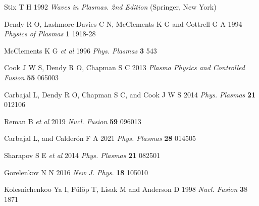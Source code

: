 \documentclass[12pt]{iopart}
\begin{document}
\begin{thebibliography}{9}
Stix T H 1992 \textit{Waves in Plasmas. 2nd Edition} (Springer, New York)

Dendy R O, Lashmore-Davies C N, McClements K G and Cottrell G A 1994 \textit{Physics of Plasmas} \textbf{1} 1918-28

McClements K G \textit{et al} 1996 \textit{Phys. Plasmas} \textbf{3} 543

Cook J W S, Dendy R O, Chapman S C 2013 \textit{Plasma Physics and Controlled Fusion} \textbf{55} 065003

Carbajal L, Dendy R O, Chapman S C, and Cook J W S 2014 \textit{Phys. Plasmas} \textbf{21} 012106

Reman B \textit{et al} 2019 \textit{Nucl. Fusion} \textbf{59} 096013

Carbajal L, and Calderón F A 2021 \textit{Phys. Plasmas} \textbf{28} 014505

Sharapov S E \textit{et al} 2014 \textit{Phys. Plasmas} \textbf{21} 082501

Gorelenkov N N 2016 \textit{New J. Phys.} \textbf{18} 105010

Kolesnichenkoo Ya I, F{\"u}l{\"o}p T, Lisak M and Anderson D 1998 \textit{Nucl. Fusion} {\textbf 38} 1871


\end{thebibliography}
\end{document}
